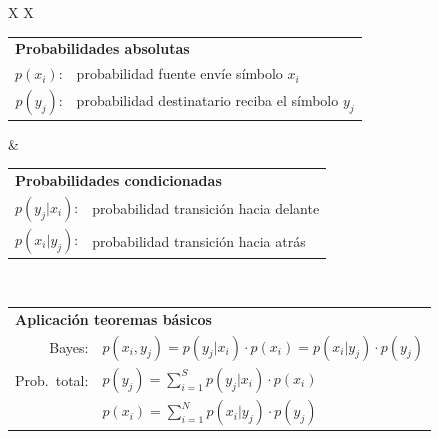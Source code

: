 \documentclass[10pt,a4paper]{article}
\begin{document}
\begin{tcolorbox}[title=Enfoque probabilístico]
    \begin{tabularx}{\linewidth}{X X}
        \begin{tabular}{rl}
            \multicolumn{2}{l}{\bfseries Probabilidades absolutas} \\
            $p(x_i)$: & probabilidad fuente envíe símbolo $x_i$ \\
            $p(y_j)$: & probabilidad destinatario reciba el símbolo $y_j$
        \end{tabular}
        &
        \begin{tabular}{rl}
            \multicolumn{2}{l}{\bfseries Probabilidades condicionadas} \\
            $p(y_j \vert x_i)$: & probabilidad transición hacia delante \\
            $p(x_i \vert y_j)$: & probabilidad transición hacia atrás
        \end{tabular}
        \\\vspace{1pt}
        \begin{tabular}{rl}
            \multicolumn{2}{l}{\bfseries Aplicación teoremas básicos} \\
            Bayes: & $p(x_i,y_j) = p(y_j \vert x_i) \cdot p(x_i) = p(x_i \vert y_j) \cdot p(y_j)$ \\
            Prob.\ total: & $p(y_j) = \sum_{i=1}^{S}{p(y_j \vert x_i) \cdot p(x_i)}$ \\
                          & $p(x_i) = \sum_{i=1}^{N}{p(x_i \vert y_j) \cdot p(y_j)}$
        \end{tabular}
    \end{tabularx}
\end{tcolorbox}
\end{document}

